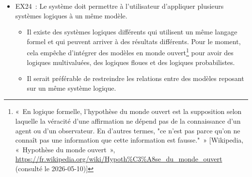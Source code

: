 {\begin{itemize}
\begin{itemize}
        \item Advenant que le dépôt interne  devienne un agent, ces vues pourraient se réaliser à l'aider d'un autre instrument.
    \end{itemize}
    \item EX24~: Le système doit permettre à l'utilisateur d'appliquer plusieurs systèmes logiques à un même modèle.
    \begin{itemize}
        \item Il existe des systèmes logiques différents qui utilisent un même langage formel et qui peuvent arriver à des résultats différents. Pour le moment, cela empêche d'intégrer des modèles en monde ouvert\footnote{«~En logique formelle, l’hypothèse du monde ouvert est la supposition selon laquelle la véracité d'une affirmation ne dépend pas de la connaissance d'un agent ou d'un observateur. En d'autres termes, "ce n'est pas parce qu'on ne connaît pas une information que cette information est fausse."~» [Wikipedia, «~Hypothèse du monde ouvert~», \url{https://fr.wikipedia.org/wiki/Hypoth\%C3\%A8se_du_monde_ouvert} (consulté le 2026-05-10)]} pour avoir des logiques multivaluées, des logiques floues et des logiques probabilistes.
        \item Il serait préférable de restreindre les relations entre des modèles reposant sur un même système logique. 
    \end{itemize}
\end{itemize}
}{}{}





